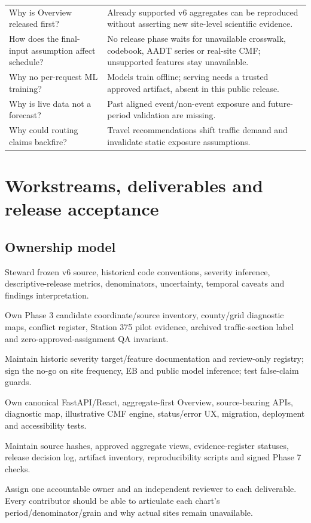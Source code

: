 \documentclass[11pt,a4paper,openany]{report}
\begin{document}
\begin{longtable}{@{}L{67mm}L{80mm}@{}}
Why is Overview released first? & Already supported v6 aggregates can be reproduced without asserting new site-level scientific evidence.\\
How does the final-input assumption affect schedule? & No release phase waits for unavailable crosswalk, codebook, AADT series or real-site CMF; unsupported features stay unavailable.\\
Why no per-request ML training? & Models train offline; serving needs a trusted approved artifact, absent in this public release.\\
Why is live data not a forecast? & Past aligned event/non-event exposure and future-period validation are missing.\\
Why could routing claims backfire? & Travel recommendations shift traffic demand and invalidate static exposure assumptions.\\
\bottomrule\end{longtable}
\normalsize

\chapter{Workstreams, deliverables and release acceptance}
\section{Ownership model}
\begin{description}[style=nextline,leftmargin=0pt,labelwidth=0pt,topsep=2pt,itemsep=4pt]
\item[Statistical analysis.] Steward frozen v6 source, historical code conventions, severity inference, descriptive-release metrics, denominators, uncertainty, temporal caveats and findings interpretation.
\item[Geospatial analysis.] Own Phase 3 candidate coordinate/source inventory, county/grid diagnostic maps, conflict register, Station 375 pilot evidence, archived traffic-section label and zero-approved-assignment QA invariant.
\item[ML and evaluation.] Maintain historic severity target/feature documentation and review-only registry; sign the no-go on site frequency, EB and public model inference; test false-claim guards.
\item[Website and integration.] Own canonical FastAPI/React, aggregate-first Overview, source-bearing APIs, diagnostic map, illustrative CMF engine, status/error UX, migration, deployment and accessibility tests.
\item[Data steward/release integrator.] Maintain source hashes, approved aggregate views, evidence-register statuses, release decision log, artifact inventory, reproducibility scripts and signed Phase 7 checks.
\end{description}
Assign one accountable owner and an independent reviewer to each deliverable. Every contributor should be able to articulate each chart's period/denominator/grain and why actual sites remain unavailable.
\end{document}
